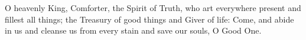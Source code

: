 O heavenly King, Comforter, the Spirit of Truth,
who art everywhere present and fillest all things;
the Treasury of good things and Giver of life:
Come, and abide in us and cleanse us from every stain and save our souls,
O Good One.